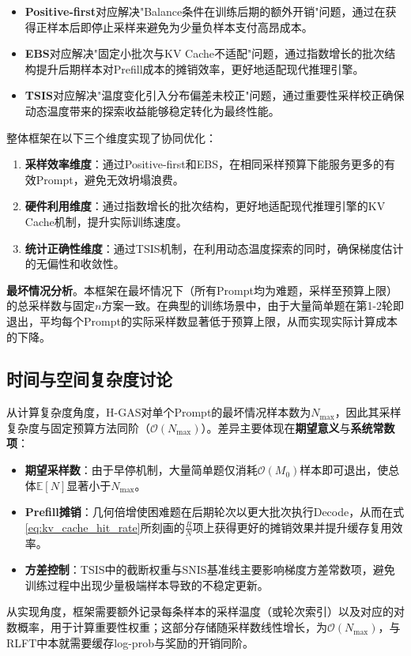 \begin{itemize}
    \item \textbf{Positive-first}对应解决"Balance条件在训练后期的额外开销"问题，通过在获得正样本后即停止采样来避免为少量负样本支付高昂成本。
    
    \item \textbf{EBS}对应解决"固定小批次与KV Cache不适配"问题，通过指数增长的批次结构提升后期样本对Prefill成本的摊销效率，更好地适配现代推理引擎。
    
    \item \textbf{TSIS}对应解决"温度变化引入分布偏差未校正"问题，通过重要性采样校正确保动态温度带来的探索收益能够稳定转化为最终性能。
\end{itemize}

整体框架在以下三个维度实现了协同优化：
\begin{enumerate}
    \item \textbf{采样效率维度}：通过Positive-first和EBS，在相同采样预算下能服务更多的有效Prompt，避免无效坍塌浪费。
    \item \textbf{硬件利用维度}：通过指数增长的批次结构，更好地适配现代推理引擎的KV Cache机制，提升实际训练速度。
    \item \textbf{统计正确性维度}：通过TSIS机制，在利用动态温度探索的同时，确保梯度估计的无偏性和收敛性。
\end{enumerate}

\textbf{最坏情况分析}。本框架在最坏情况下（所有Prompt均为难题，采样至预算上限）的总采样数与固定$n$方案一致。在典型的训练场景中，由于大量简单题在第1-2轮即退出，平均每个Prompt的实际采样数显著低于预算上限，从而实现实际计算成本的下降。

\subsection{时间与空间复杂度讨论}
\label{subsec:complexity_discussion}

从计算复杂度角度，H-GAS对单个Prompt的最坏情况样本数为$N_{\max}$，因此其采样复杂度与固定预算方法同阶（$\mathcal{O}(N_{\max})$）。差异主要体现在\textbf{期望意义}与\textbf{系统常数项}：
\begin{itemize}
    \item \textbf{期望采样数}：由于早停机制，大量简单题仅消耗$\mathcal{O}(M_0)$样本即可退出，使总体$\mathbb{E}[N]$显著小于$N_{\max}$。
    \item \textbf{Prefill摊销}：几何倍增使困难题在后期轮次以更大批次执行Decode，从而在式\eqref{eq:kv_cache_hit_rate}所刻画的$\frac{R}{N}$项上获得更好的摊销效果并提升缓存复用效率。
    \item \textbf{方差控制}：TSIS中的截断权重与SNIS基准线主要影响梯度方差常数项，避免训练过程中出现少量极端样本导致的不稳定更新。
\end{itemize}
从实现角度，框架需要额外记录每条样本的采样温度（或轮次索引）以及对应的对数概率，用于计算重要性权重；这部分存储随采样数线性增长，为$\mathcal{O}(N_{\max})$，与RLFT中本就需要缓存log-prob与奖励的开销同阶。

